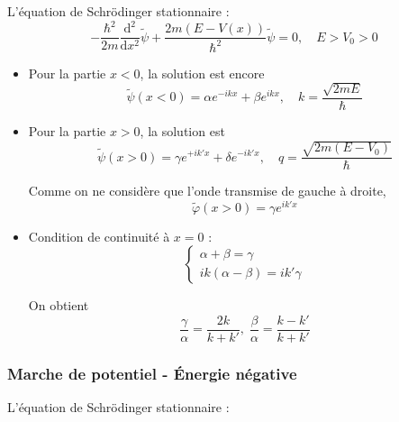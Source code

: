 L'équation de Schrödinger stationnaire : 
\begin{equation}
 - \frac{\hbar ^{2}}{2m}  \frac{\mathrm{d} ^{2}}{\mathrm{d} x ^{2}}  \widetilde \psi + \frac{2m (E - V(x))}{\hbar ^{2}}  \widetilde \psi = 0, \quad E > V_0 > 0 
\end{equation}
\begin{itemize}

    \item Pour la partie $x< 0$, la solution est encore 
\begin{equation}
  \widetilde \psi (x < 0 ) =  \alpha e ^{-ikx} + \beta e ^{ikx} ,\quad k = \frac{\sqrt{2mE}}{\hbar} 
\end{equation}

\item Pour la partie $x > 0$, la solution est 
\begin{equation}
  \widetilde \psi (x >0) =  \gamma e ^{+ik 'x} + \delta e ^{-ik 'x} , \quad q = \frac{\sqrt{2m (E-V_0)}}{\hbar} 
\end{equation}

Comme on ne considère que l'onde transmise de gauche à droite, 
\begin{equation}
  \widetilde{ \varphi}(x >0) = \gamma e ^{ik' x}
\end{equation}

\item Condition de continuité à $x = 0$ : 
  \begin{equation}
    \begin{cases}
        \alpha + \beta = \gamma \\ 
        ik(\alpha - \beta) = ik'\gamma
    \end{cases}
  \end{equation}

  On obtient 
  \begin{equation}
    \frac{\gamma}{\alpha}  = \frac{2k}{k + k'}, \; \frac{\beta}{\alpha}  = \frac{k- k'}{k + k'} 
  \end{equation}
\end{itemize}

\subsubsection{Marche de potentiel - Énergie négative} %
\label{sec:Marche de potentiel - Énergie négative}

L'équation de Schrödinger stationnaire : 

